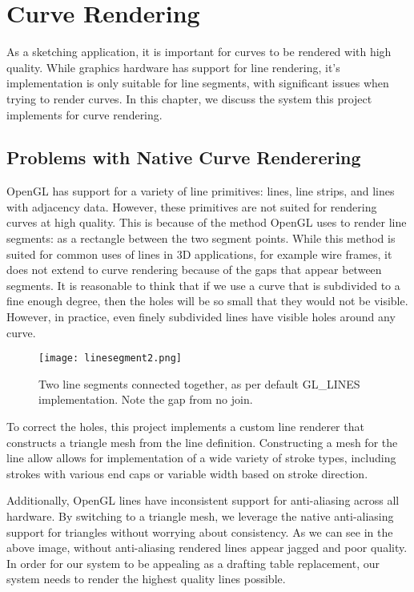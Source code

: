 \chapter{Curve Rendering}

As a sketching application, it is important for curves to be rendered with high quality.
While graphics hardware has support for line rendering, it's implementation is only suitable for line segments, with significant issues when trying to render curves.
In this chapter, we discuss the system this project implements for curve rendering.

\section{Problems with Native Curve Renderering}
OpenGL has support for a variety of line primitives: lines, line strips, and lines with adjacency data.
However, these primitives are not suited for rendering curves at high quality.
This is because of the method OpenGL uses to render line segments: as a rectangle between the two segment points.
While this method is suited for common uses of lines in 3D applications, for example wire frames, it does not extend to curve rendering because of the gaps that appear between segments.
It is reasonable to think that if we use a curve that is subdivided to a fine enough degree, then the holes will be so small that they would not be visible.
However, in practice, even finely subdivided lines have visible holes around any curve.

\begin{figure}
	\texttt{[image: linesegment2.png]}
	\caption{Two line segments connected together, as per default GL\_LINES implementation. Note the gap from no join.}
\end{figure}

To correct the holes, this project implements a custom line renderer that constructs a triangle mesh from the line definition.
Constructing a mesh for the line allow allows for implementation of a wide variety of stroke types, including strokes with various end caps or variable width based on stroke direction. 

Additionally, OpenGL lines have inconsistent support for anti-aliasing across all hardware.
By switching to a triangle mesh, we leverage the native anti-aliasing support for triangles without worrying about consistency.
As we can see in the above image, without anti-aliasing rendered lines appear jagged and poor quality.
In order for our system to be appealing as a drafting table replacement, our system needs to render the highest quality lines possible.

